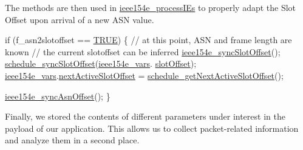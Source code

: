  The methods are then used in \hyperlink{_i_e_e_e802154_e_8c_aa42be4c16fe53e0460a63ae76438d668}{ieee154e\+\_\+process\+I\+Es} to properly adapt the Slot Offset upon arrival of a new A\+SN value. 
\begin{DoxyCodeInclude}
         \textcolor{keywordflow}{if} (f\_asn2slotoffset == \hyperlink{types_8h_aa8cecfc5c5c054d2875c03e77b7be15d}{TRUE}) \{
            \textcolor{comment}{// at this point, ASN and frame length are known}
            \textcolor{comment}{// the current slotoffset can be inferred}
            \hyperlink{_i_e_e_e802154_e_8c_aee836d385fb2379dd04956ad7b3cfe37}{ieee154e\_syncSlotOffset}();
            \hyperlink{group___schedule_gaf44e496db5d623ea8168d0eaeffc8b2d}{schedule\_syncSlotOffset}(\hyperlink{_i_e_e_e802154_e_8c_abbfc7f36c7b2d2635f4407908445a89b}{ieee154e\_vars}.
      \hyperlink{structieee154e__vars__t_afaebb453ec589e83866278ddf8d1cb9d}{slotOffset});
            \hyperlink{_i_e_e_e802154_e_8c_abbfc7f36c7b2d2635f4407908445a89b}{ieee154e\_vars}.\hyperlink{structieee154e__vars__t_a4c8775df9573fdd1e6a4cfe501d95d60}{nextActiveSlotOffset} = 
      \hyperlink{group___schedule_ga01252633416fb574b1277b1303030248}{schedule\_getNextActiveSlotOffset}();

            \hyperlink{_i_e_e_e802154_e_8c_a8decad47b1e2b92bfc8a910f19d30ab3}{ieee154e\_syncAsnOffset}();
         \}
\end{DoxyCodeInclude}


Finally, we stored the contents of different parameters under interest in the payload of our application. This allows us to collect packet-\/related information and analyze them in a second place.

